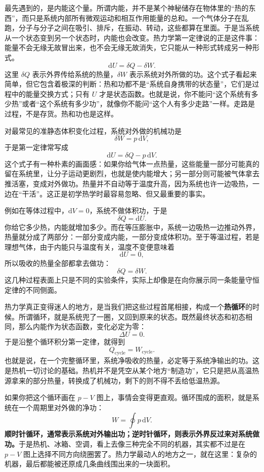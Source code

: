 \documentclass[UTF8]{ctexbook}
\begin{document}
最先遇到的，是内能这个量。所谓内能，并不是某个神秘储存在物体里的“热的东西”，而只是系统内部所有微观运动和相互作用能量的总和。一个气体分子在乱跑，分子与分子之间在吸引、排斥，在振动、转动，这些都算在里面。于是当系统从一个状态变到另一个状态时，内能也会改变。热力学第一定律说的正是这件事：能量不会无缘无故冒出来，也不会无缘无故消失，它只能从一种形式转成另一种形式。
\[
\mathrm dU=\delta Q-\delta W.
\]
这里 \(\delta Q\) 表示外界传给系统的热量，\(\delta W\) 表示系统对外所做的功。这个式子看起来简单，但它包含着极深的判断：热和功都不是“系统自身携带的状态量”，它们是过程中的能量交换方式；只有 \(U\) 才是状态函数。也就是说，你不能问“这个系统有多少热”或者“这个系统有多少功”，就像你不能问“这个人有多少走路”一样。走路是过程，不是存货。热和功也是这样。

对最常见的准静态体积变化过程，系统对外做的机械功是
\[
\delta W=p\,\mathrm dV,
\]
于是第一定律常写成
\[
\mathrm dU=\delta Q-p\,\mathrm dV.
\]
这个式子有一种朴素的画面感：如果你给气体一点热量，这些能量一部分可能真的留在系统里，让分子运动更剧烈，也就是使内能增大；另一部分则可能被气体拿去推活塞，变成对外做功。热量并不自动等于温度升高，因为系统也许一边吸热，一边在“干活”。这正是初学热学时最容易忽略、但又最重要的事实。

例如在等体过程中，\(\mathrm dV=0\)，系统不做体积功，于是
\[
\delta Q=\mathrm dU.
\]
你给它多少热，内能就增加多少。而在等压膨胀中，系统一边吸热一边推动外界，热量就分成了两部分：一部分变成内能，一部分变成体积功。至于等温过程，若是理想气体，由于内能只与温度有关，温度不变便意味着
\[
\mathrm dU=0,
\]
所以吸收的热量全部都拿去做功：
\[
\delta Q=\delta W.
\]
这几种过程表面上只是不同的实验条件，实际上却像是在向你展示同一条能量守恒定律的不同侧面。

热力学真正变得迷人的地方，是当我们把这些过程首尾相接，构成一个\textbf{热循环}的时候。所谓循环，就是系统兜了一圈，又回到原来的状态。既然最终状态和初态相同，那么内能作为状态函数，变化必定为零：
\[
\Delta U=0.
\]
于是沿整个循环积分第一定律，就得到
\[
Q_{\mathrm{cycle}}=W_{\mathrm{cycle}}.
\]
也就是说，在一个完整循环里，系统净吸收的热量，必定等于系统净输出的功。这是热机一切讨论的基础。热机并不是凭空从某个地方“制造功”，它只是把从高温热源拿来的部分热量，转换成了机械功，剩下的则不得不丢给低温热源。

如果你把这个循环画在 \(p-V\) 图上，事情会变得更直观。循环围成的面积，就是系统在一个周期里对外做的净功：
\[
W=\oint p\,\mathrm dV.
\]
\textbf{顺时针循环，通常表示系统对外输出功；逆时针循环，则表示外界反过来对系统做功。}于是热机、冰箱、空调，看上去像三种完全不同的机器，其实都不过是在 \(p-V\) 图上选择不同方向绕圈罢了。热力学最动人的地方之一，就在这里：复杂的机器，最后都能被还原成几条曲线围出来的一块面积。
\end{document}
